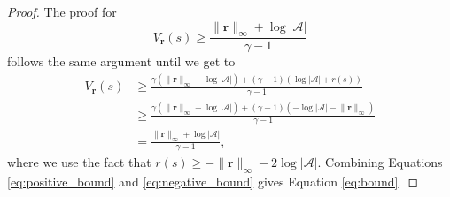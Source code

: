 \documentclass{mpaper}
\newcommand{\V}{V_{\mathbf{r}}}
\newcommand{\rinf}{\lVert \mathbf{r} \rVert_\infty}
\begin{document}
\begin{proof}
  The proof for
  \begin{equation} \label{eq:negative_bound}
    \V(s) \ge \frac{\rinf + \log|\mathcal{A}|}{\gamma - 1}
  \end{equation}
  follows the same argument until we get to
  \begin{align*}
    \V(s) &\ge \frac{\gamma(\rinf + \log|\mathcal{A}|) + (\gamma - 1)(\log|\mathcal{A}| + r(s))}{\gamma - 1} \\
          &\ge \frac{\gamma(\rinf + \log|\mathcal{A}|) + (\gamma - 1)(-\log|\mathcal{A}| -\rinf)}{\gamma - 1} \\
          &= \frac{\rinf + \log|\mathcal{A}|}{\gamma - 1},
  \end{align*}
  where we use the fact that $r(s) \ge -\rinf - 2\log|\mathcal{A}|$. Combining
  Equations \ref{eq:positive_bound} and \ref{eq:negative_bound} gives
  Equation \ref{eq:bound}.
\end{proof}
\end{document}
